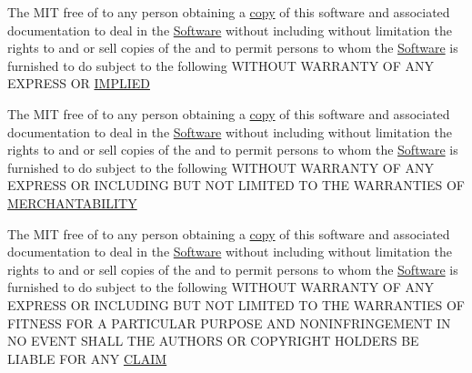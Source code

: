 \begin{DoxyCompactItemize}
\item 
The M\+I\+T free of to any person obtaining a \hyperlink{license_8txt_aff1d4c6b756ebf691fa44a0904f68658}{copy} of this software and associated documentation to deal in the \hyperlink{license_8txt_a22a1529885b3e9d66b0c72fe604fc3dc}{Software} without including without limitation the rights to and or sell copies of the and to permit persons to whom the \hyperlink{license_8txt_a22a1529885b3e9d66b0c72fe604fc3dc}{Software} is furnished to do subject to the following W\+I\+T\+H\+O\+U\+T W\+A\+R\+R\+A\+N\+T\+Y O\+F A\+N\+Y E\+X\+P\+R\+E\+S\+S O\+R \hyperlink{license_8txt_ab0624cdd79a1b72ae3e8cb7b147149da}{I\+M\+P\+L\+I\+E\+D}
\item 
The M\+I\+T free of to any person obtaining a \hyperlink{license_8txt_aff1d4c6b756ebf691fa44a0904f68658}{copy} of this software and associated documentation to deal in the \hyperlink{license_8txt_a22a1529885b3e9d66b0c72fe604fc3dc}{Software} without including without limitation the rights to and or sell copies of the and to permit persons to whom the \hyperlink{license_8txt_a22a1529885b3e9d66b0c72fe604fc3dc}{Software} is furnished to do subject to the following W\+I\+T\+H\+O\+U\+T W\+A\+R\+R\+A\+N\+T\+Y O\+F A\+N\+Y E\+X\+P\+R\+E\+S\+S O\+R I\+N\+C\+L\+U\+D\+I\+N\+G B\+U\+T N\+O\+T L\+I\+M\+I\+T\+E\+D T\+O T\+H\+E W\+A\+R\+R\+A\+N\+T\+I\+E\+S O\+F \hyperlink{license_8txt_a82e4fcb28d3925b81ac5f50e2b22c270}{M\+E\+R\+C\+H\+A\+N\+T\+A\+B\+I\+L\+I\+T\+Y}
\item 
The M\+I\+T free of to any person obtaining a \hyperlink{license_8txt_aff1d4c6b756ebf691fa44a0904f68658}{copy} of this software and associated documentation to deal in the \hyperlink{license_8txt_a22a1529885b3e9d66b0c72fe604fc3dc}{Software} without including without limitation the rights to and or sell copies of the and to permit persons to whom the \hyperlink{license_8txt_a22a1529885b3e9d66b0c72fe604fc3dc}{Software} is furnished to do subject to the following W\+I\+T\+H\+O\+U\+T W\+A\+R\+R\+A\+N\+T\+Y O\+F A\+N\+Y E\+X\+P\+R\+E\+S\+S O\+R I\+N\+C\+L\+U\+D\+I\+N\+G B\+U\+T N\+O\+T L\+I\+M\+I\+T\+E\+D T\+O T\+H\+E W\+A\+R\+R\+A\+N\+T\+I\+E\+S O\+F F\+I\+T\+N\+E\+S\+S F\+O\+R A P\+A\+R\+T\+I\+C\+U\+L\+A\+R P\+U\+R\+P\+O\+S\+E A\+N\+D N\+O\+N\+I\+N\+F\+R\+I\+N\+G\+E\+M\+E\+N\+T I\+N N\+O E\+V\+E\+N\+T S\+H\+A\+L\+L T\+H\+E A\+U\+T\+H\+O\+R\+S O\+R C\+O\+P\+Y\+R\+I\+G\+H\+T H\+O\+L\+D\+E\+R\+S B\+E L\+I\+A\+B\+L\+E F\+O\+R A\+N\+Y \hyperlink{license_8txt_a6748037be7bf72df72169eafdc8c492e}{C\+L\+A\+I\+M}
\item 

\end{DoxyCompactItemize}
